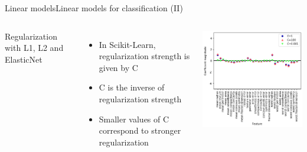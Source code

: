 \documentclass[10pt,compress]{beamer} %
\begin{document}
\begin{frame}{Linear models}{Linear models for classification (II)}
    \begin{columns}
        Regularization with L1, L2 and ElasticNet
        \begin{itemize}
            \item In Scikit-Learn, regularization strength is given by C
            \item C is the inverse of regularization strength
            \item Smaller values of C correspond to stronger regularization
        \end{itemize}

        \centering \includegraphics[width=\linewidth]{figs/logistic-c.png}
    \end{columns}
\end{frame}

\end{document}
